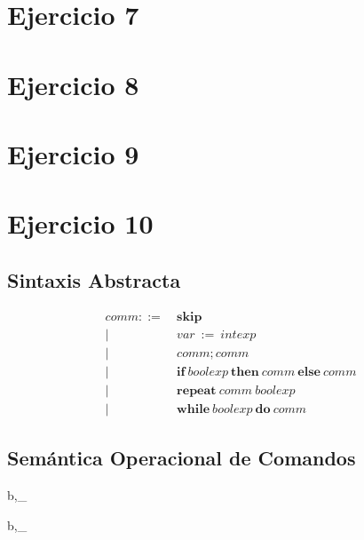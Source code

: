\documentclass{article}
\begin{document}
\vspace{5mm}

\section{Ejercicio 7}


\section{Ejercicio 8}


\section{Ejercicio 9}



\section{Ejercicio 10}
\subsection{Sintaxis Abstracta}
\begin{align*}
comm ::=\ &\mathbf{skip}\\
|\ &var\ :=\ intexp\\
|\ &comm;comm\\
|\ &\mathbf{if\ } boolexp \mathbf{\ then\  } comm \mathbf{\ else\ } comm\\
|\ &\mathbf{repeat\ }comm\ boolexp\\
|\ &\mathbf{while\ } boolexp \mathbf{\ do\ } comm
\end{align*}

\subsection{Sem\'antica Operacional de Comandos}

\vspace{4mm}

{\langle b,\sigma \rangle \Downarrow_{} }

\vspace{4mm}

{\langle b,\sigma \rangle \Downarrow_{} }

\nocite{*}


\end{document}
